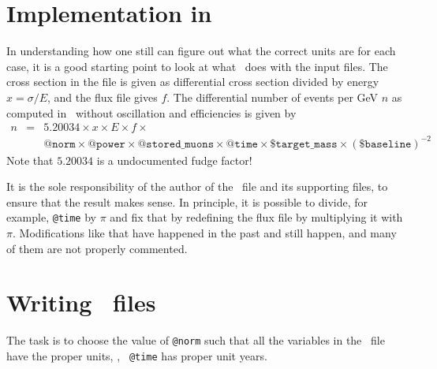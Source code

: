 \begin{appendix}
\section*{Implementation in \GLOBES }

In understanding how one still can figure out what the correct units
are for each case, it is a good starting point to look at what
\GLOBES\ does with the input files. The cross section in the file is given as
differential cross section divided by energy $x=\sigma/E$, and the flux file
gives $f$. The differential number of events per GeV $n$ as computed in
\GLOBES\ without oscillation and efficiencies is given by
\begin{eqnarray}
n &=& 5.20034\times x\times E\times f\times \nonumber \\
&&\mathtt{@norm}\times\mathtt{@power}\times\mathtt{@stored\_muons}\times\mathtt{@time}\times\mathtt{\$target\_mass}\times(\mathtt{\$baseline})^{-2} \nonumber
\end{eqnarray}
Note that $5.20034$ is a undocumented fudge factor!

It is the sole responsibility of the author of the \AEDL\ file and its
supporting files, to ensure that the result makes sense. In
principle, it is possible to divide, for example, {\tt @time}  by
$\pi$ and fix that by redefining the flux file by multiplying
it with $\pi$. Modifications like that have happened in the past
and still happen, and many of them are not properly commented.
 
\section*{Writing \AEDL\ files}

The task is to choose the value of  {\tt @norm} such that all the
variables in the \AEDL\ file have the proper units, \eg , {\tt
  @time} has proper unit years.


\end{appendix}
